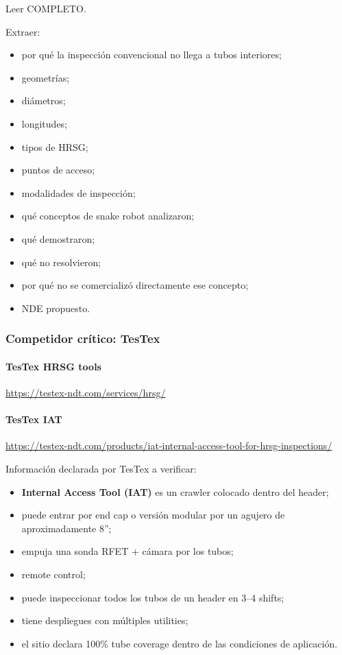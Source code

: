 \documentclass[11pt,a4paper]{article}
\begin{document}
Leer COMPLETO.

Extraer:

\begin{itemize}
\item por qué la inspección convencional no llega a tubos interiores;
\item geometrías;
\item diámetros;
\item longitudes;
\item tipos de HRSG;
\item puntos de acceso;
\item modalidades de inspección;
\item qué conceptos de snake robot analizaron;
\item qué demostraron;
\item qué no resolvieron;
\item por qué no se comercializó directamente ese concepto;
\item NDE propuesto.
\end{itemize}


\subsubsection*{Competidor crítico: TesTex}

\paragraph*{TesTex HRSG tools}
\url{https://testex-ndt.com/services/hrsg/}


\paragraph*{TesTex IAT}
\url{https://testex-ndt.com/products/iat-internal-access-tool-for-hrsg-inspections/}

Información declarada por TesTex a verificar:

\begin{itemize}
\item \textbf{Internal Access Tool (IAT)} es un crawler colocado dentro del header;
\item puede entrar por end cap o versión modular por un agujero de aproximadamente 8'';
\item empuja una sonda RFET + cámara por los tubos;
\item remote control;
\item puede inspeccionar todos los tubos de un header en 3–4 shifts;
\item tiene despliegues con múltiples utilities;
\item el sitio declara 100\% tube coverage dentro de las condiciones de aplicación.
\end{itemize}
\end{document}
